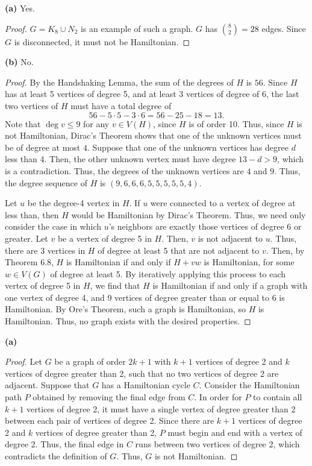 \documentclass[12pt]{article}
\begin{document}
\newpage{}

	{\bf (a)} Yes.
	\begin{proof}
		$G = K_8 \cup N_2$ is an example of such a graph.
		$G$ has ${8 \choose 2} = 28$ edges.
		Since $G$ is disconnected, it must not be Hamiltonian.
	\end{proof}

	{\bf (b)} No.
	\begin{proof}
		By the Handshaking Lemma, the sum of the degrees of $H$ is $56$.
		Since $H$ has at least 5 vertices of degree 5, and at least 3 vertices of degree of 6, the last two vertices of $H$ must have a total degree of $$56 - 5 \cdot 5 - 3 \cdot 6 = 56 - 25 - 18 = 13.$$
    		Note that $\deg v \leq 9$ for any $v \in V(H)$, since $H$ is of order 10.
    		Thus, since $H$ is not Hamiltonian, Dirac's Theorem shows that one of the unknown vertices must be of degree at most $4$.
		Suppose that one of the unknown vertices has degree $d$ less than 4.
		Then, the other unknown vertex must have degree $13 - d > 9$, which is a contradiction.
		Thus, the degrees of the unknown vertices are $4$ and $9$.
		Thus, the degree sequence of $H$ is $(9, 6, 6, 6, 5, 5, 5, 5, 5, 4)$.
    
		Let $u$ be the degree-4 vertex in $H$.
		If $u$ were connected to a vertex of degree at less than, then $H$ would be Hamiltonian by Dirac's Theorem.
		Thus, we need only consider the case in which $u$'s neighbors are exactly those vertices of degree 6 or greater.
		Let $v$ be a vertex of degree 5 in $H$.
		Then, $v$ is not adjacent to $u$.
		Thus, there are 3 vertices in $H$ of degree at least 5 that are not adjacent to $v$.
		Then, by Theorem 6.8, $H$ is Hamiltonian if and only if $H+vw$ is Hamiltonian, for some $w \in V(G)$ of degree at least 5.
		By iteratively applying this process to each vertex of degree 5 in $H$, we find that $H$ is Hamiltonian if and only if a graph with one vertex of degree 4, and 9 vertices of degree greater than or equal to 6 is Hamiltonian.
		By Ore's Theorem, such a graph is Hamiltonian, so $H$ is Hamiltonian.
		Thus, no graph exists with the desired properties.
	\end{proof}
\newpage{}
    {\bf (a)}
    \begin{proof}
	Let $G$ be a graph of order $2k+1$ with $k+1$ vertices of degree 2 and $k$ vertices of degree greater than 2, such that no two vertices of degree 2 are adjacent.
	Suppose that $G$ has a Hamiltonian cycle $C$.
	Consider the Hamiltonian path $P$ obtained by removing the final edge from $C$.
	In order for $P$ to contain all $k+1$ vertices of degree 2, it must have a single vertex of degree greater than 2 between each pair of vertices of degree 2.
	Since there are $k+1$ vertices of degree 2 and $k$ vertices of degree greater than 2, $P$ must begin and end with a vertex of degree 2.
	Thus, the final edge in $C$ runs between two vertices of degree 2, which contradicts the definition of $G$.
	Thus, $G$ is not Hamiltonian.
    \end{proof}
\end{document}
